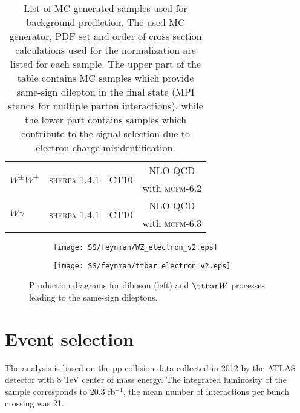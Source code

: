\begin{table}[ht]
\begin{center}
\begin{tabular}{l|c|c|c}
\multirow{2}{*}{$W^{\pm}W^{\mp}$} & \multirow{2}{*}{{\scshape sherpa-1.4.1}} & \multirow{2}{*}{CT10}& NLO QCD \\
& &  & with {\scshape mcfm-6.2}\\
\hline
\multirow{2}{*}{$W\gamma$} & \multirow{2}{*}{{\scshape sherpa}-1.4.1} & \multirow{2}{*}{CT10}& NLO QCD\\
& &  & with {\scshape mcfm-6.3}\\
\hline
\end{tabular}
\end{center}
  \caption{List of MC generated samples used for background prediction. 
  The used MC generator, PDF set and order of cross section calculations used for the normalization are listed for each sample.
  The upper part of the table contains MC samples which provide same-sign dilepton in the final state
  (MPI stands for multiple parton interactions), 
  while the lower part contains samples which contribute to the signal selection due to electron charge misidentification.}
\label{tab:MC_cross}
\end{table}

\begin{figure}

\begin{subfigure}{.5\textwidth}
  \centering
  \texttt{[image: SS/feynman/WZ\_electron\_v2.eps]}
\end{subfigure}%
\begin{subfigure}{.5\textwidth}
  \centering
  \texttt{[image: SS/feynman/ttbar\_electron\_v2.eps]}
\end{subfigure}

\caption{Production diagrams for diboson (left) and $\ttbar W$ processes leading to the same-sign dileptons.}
  \label{fig:prompt_bkg_feynman_diag}
\end{figure}


\section{Event selection}

The analysis is based on the pp collision data collected in 2012 by the ATLAS detector with 8 TeV center of mass energy.
The integrated luminosity of the sample corresponds to 20.3 fb$^{-1}$, the mean number of interactions per bunch crossing was 21.

